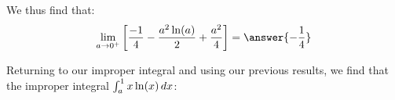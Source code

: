 \documentclass{ximera}
\begin{document}
\begin{exercise}
\begin{exercise}
\begin{exercise}
\begin{exercise}
\begin{exercise}

We thus find that:
\[
\lim_{a \to 0^+} \left[ \frac{-1}{4} -\frac{a^2\ln(a)}{2}+\frac{a^2}{4}  \right] = \answer{-\frac{1}{4}}
\]

Returning to our improper integral and using our previous results, we find that the improper integral $\int_{a}^{1} x\ln(x) \mathop{}\!d x$: 

\begin{multipleChoice}
\end{multipleChoice}

\end{exercise}
\end{exercise}
\end{exercise}
\end{exercise}
\end{exercise}
\end{document}
